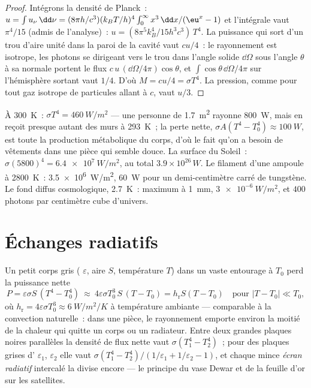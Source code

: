 \begin{proof}
Intégrons la densité de Planck~: $u = \int u_\nu\,\dd\nu = (8\pi h/c^3)(k_BT/h)^4
\int_0^\infty x^3\,\dd x/(\eu^x - 1)$ et l'intégrale vaut $\pi^4/15$
(admis de l'analyse)~: $u = (8\pi^5k_B^4/15h^3c^3)\,T^4$. La puissance
qui sort d'un trou d'aire unité dans la paroi de la cavité vaut $cu/4$~: le
rayonnement est isotrope, les photons se dirigeant vers le trou dans
l'angle solide $\dd\Omega$ sous l'angle $\theta$ à sa normale portent le
flux $c\,u\,(\dd\Omega/4\pi)\cos\theta$, et $\int\cos\theta\,\dd\Omega/4\pi$
sur l'hémisphère sortant vaut $1/4$. D'où $M = cu/4 = \sigma T^4$.
La pression, comme pour tout gaz isotrope de particules allant à $c$, vaut
$u/3$.
\end{proof}

\begin{example}\label{ex:b2:thermal-radiation:orders}
À \qty{300}{K}~: $\sigma T^4 = \qty{460}{W/m^2}$ --- une personne de
\qty{1.7}{m^2} rayonne \qty{800}{W}, mais en reçoit presque autant des
murs à \qty{293}{K}~; la perte nette, $\sigma A(T^4 - T_0^4) \approx
\qty{100}{W}$, est toute la production métabolique du corps, d'où le fait qu'on
a besoin de vêtements dans une pièce qui semble douce. La surface du Soleil~: $\sigma
(5800)^4 = \qty{6.4e7}{W/m^2}$, au total $3.9 \times 10^{26}\,\unit{W}$. Le
filament d'une ampoule à \qty{2800}{K}~: \qty{3.5e6}{W/m^2}, \qty{60}{W} pour un
demi-centimètre carré de tungstène. Le fond diffus cosmologique, \qty{2.7}{K}~:
maximum à \qty{1}{mm}, $\qty{3e-6}{W/m^2}$, et $400$ photons par centimètre
cube d'univers.
\end{example}

\section{Échanges radiatifs}

\begin{proposition}\label{prop:b2:thermal-radiation:exchange}
Un petit corps gris ( $\varepsilon$, aire $S$, température $T$)
dans un vaste entourage à $T_0$ perd la puissance nette
\[
P = \varepsilon\sigma S\,(T^4 - T_0^4)
\ \approx\ 4\varepsilon\sigma T_0^3\,S\,(T - T_0) = h_{\text{r}}S(T - T_0)
\quad\text{pour } |T - T_0| \ll T_0 ,
\]
où $h_{\text{r}} = 4\varepsilon\sigma T_0^3 \approx \qty{6}{W/m^2/K}$ à
température ambiante --- comparable à la convection naturelle~: dans une pièce, le
rayonnement emporte environ la moitié de la chaleur qui quitte un corps ou un radiateur.
Entre deux grandes plaques noires parallèles la densité de flux nette vaut
$\sigma(T_1^4 - T_2^4)$~; pour des plaques grises d' $\varepsilon_1$,
$\varepsilon_2$ elle vaut $\sigma(T_1^4 - T_2^4)/(1/\varepsilon_1 + 1/\varepsilon_2
- 1)$, et chaque mince \emph{écran radiatif} intercalé la divise
encore --- le principe du vase Dewar et de la feuille d'or sur les
satellites.
\end{proposition}

